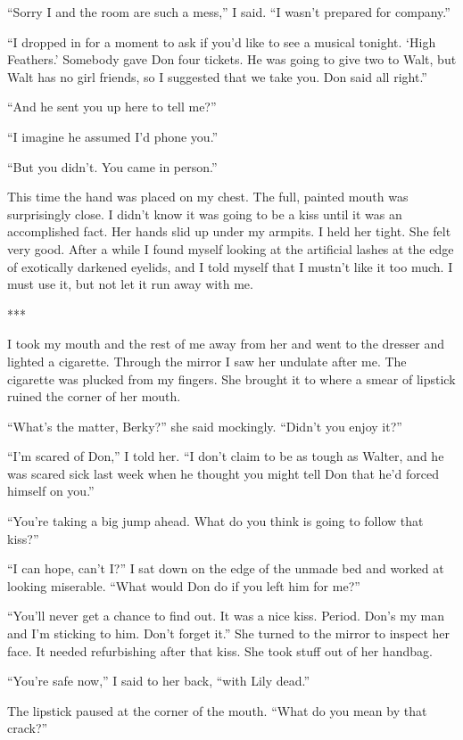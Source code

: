 \documentclass{novel}
\begin{document}
{“Sorry I and the room are such a mess,” I said. “I wasn’t prepared for company.”

“I dropped in for a moment to ask if you’d like to see a musical tonight. ‘High Feathers.’ Somebody gave Don four tickets. He was going to give two to Walt, but Walt has no girl friends, so I suggested that we take you. Don said all right.”

“And he sent you up here to tell me?”

“I imagine he assumed I’d phone you.”

“But you didn’t. You came in person.”

This time the hand was placed on my chest. The full, painted mouth was surprisingly close. I didn’t know it was going to be a kiss until it was an accomplished fact. Her hands slid up under my armpits. I held her tight. She felt very good. After a while I found myself looking at the artificial lashes at the edge of exotically darkened eyelids, and I told myself that I mustn’t like it too much. I must use it, but not let it run away with me.

***

I took my mouth and the rest of me away from her and went to the dresser and lighted a cigarette. Through the mirror I saw her undulate after me. The cigarette was plucked from my fingers. She brought it to where a smear of lipstick ruined the corner of her mouth.

“What’s the matter, Berky?” she said mockingly. “Didn’t you enjoy it?”

“I’m scared of Don,” I told her. “I don’t claim to be as tough as Walter, and he was scared sick last week when he thought you might tell Don that he’d forced himself on you.”

“You’re taking a big jump ahead. What do you think is going to follow that kiss?”

“I can hope, can’t I?” I sat down on the edge of the unmade bed and worked at looking miserable. “What would Don do if you left him for me?”

“You’ll never get a chance to find out. It was a nice kiss. Period. Don’s my man and I’m sticking to him. Don’t forget it.” She turned to the mirror to inspect her face. It needed refurbishing after that kiss. She took stuff out of her handbag.

“You’re safe now,” I said to her back, “with Lily dead.”

The lipstick paused at the corner of the mouth. “What do you mean by that crack?”

}
\end{document}
